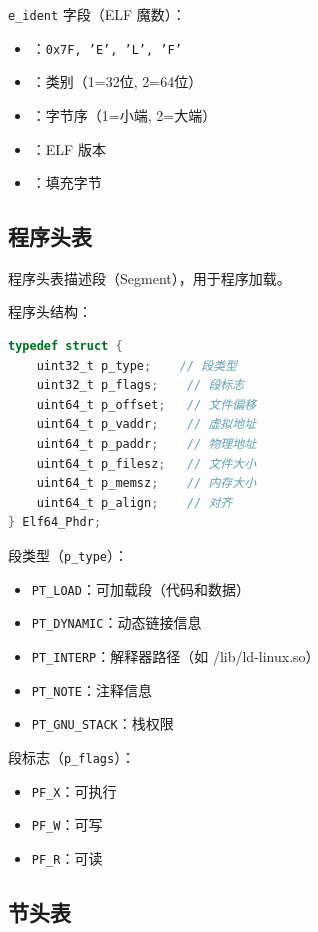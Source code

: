 \lstinline!e_ident! 字段（ELF 魔数）：
\begin{itemize}
  \item [0x00-0x03]：\texttt{0x7F, 'E', 'L', 'F'}
  \item [0x04]：类别（1=32位, 2=64位）
  \item [0x05]：字节序（1=小端, 2=大端）
  \item [0x06]：ELF 版本
  \item [0x07-0x0F]：填充字节
\end{itemize}

\subsection{程序头表}


程序头表描述段（Segment），用于程序加载。

程序头结构：
\begin{lstlisting}[language=C]
typedef struct {
    uint32_t p_type;    // 段类型
    uint32_t p_flags;    // 段标志
    uint64_t p_offset;   // 文件偏移
    uint64_t p_vaddr;    // 虚拟地址
    uint64_t p_paddr;    // 物理地址
    uint64_t p_filesz;   // 文件大小
    uint64_t p_memsz;    // 内存大小
    uint64_t p_align;    // 对齐
} Elf64_Phdr;
\end{lstlisting}

段类型（\lstinline!p_type!）：
\begin{itemize}
  \item \texttt{PT\_LOAD}：可加载段（代码和数据）
  \item \texttt{PT\_DYNAMIC}：动态链接信息
  \item \texttt{PT\_INTERP}：解释器路径（如 /lib/ld-linux.so）
  \item \texttt{PT\_NOTE}：注释信息
  \item \texttt{PT\_GNU\_STACK}：栈权限
\end{itemize}

段标志（\lstinline!p_flags!）：
\begin{itemize}
  \item \texttt{PF\_X}：可执行
  \item \texttt{PF\_W}：可写
  \item \texttt{PF\_R}：可读
\end{itemize}

\subsection{节头表}

